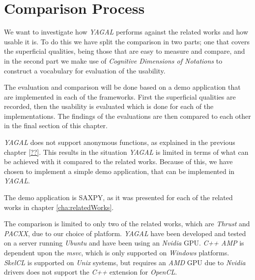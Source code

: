 \section{Comparison Process}
We want to investigate how \textit{YAGAL} performs against the related works and how usable it is. To do this we have split the comparison in two parts; one that covers the superficial qualities, being those that are easy to measure and compare, and in the second part we make use of \textit{Cognitive Dimensions of Notations} to construct a vocabulary for evaluation of the usability.

The evaluation and comparison will be done based on a demo application that are implemented in each of the frameworks. First the superficial qualities are recorded, then the usability is evaluated which is done for each of the implementations. The findings of the evaluations are then compared to each other in the final section of this chapter.

\textit{YAGAL} does not support anonymous functions, as explained in the previous chapter \ref{??}. This results in the situation \textit{YAGAL} is limited in terms of what can be achieved with it compared to the related works. Because of this, we have chosen to implement a simple demo application, that can be implemented in \textit{YAGAL}. 

The demo application is SAXPY, as it was presented for each of the related works in chapter \ref{cha:relatedWorks}.

The comparison is limited to only two of the related works, which are \textit{Thrust} and \textit{PACXX}, due to our choice of platform. \textit{YAGAL} have been developed and tested on a server running \textit{Ubuntu} and have been using an \textit{Nvidia} GPU. \textit{C++ AMP} is dependent upon the \textit{msvc}, which is only supported on \textit{Windows} platforms. \textit{SkelCL} is supported on \textit{Unix} systems, but requires an \textit{AMD} GPU due to \textit{Nvidia} drivers does not support the \textit{C++} extension for \textit{OpenCL}.
